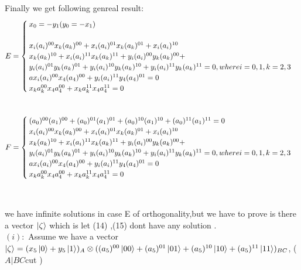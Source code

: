 \documentclass[a4paper,12pt]{article}
\begin{document}
Finally we get following genreal result:
\begin{equation}
E = \begin{cases}
x_{0}=-y_{1}  (y_{0}=-x_{1} )      &  \\

\newline \\
x_{i}(a_{i})^{00}x_{k}(a_{k})^{00}+x_{i}(a_{i})^{01}x_{k}(a_{k})^{01}+x_{i}(a_{i})^{10}\\x_{k}(a_{k})^{10}+x_{i}(a_{i})^{11}x_{k}(a_{k})^{11}+y_{i}(a_{i})^{00}y_{k}(a_{k})^{00}+\\y_{i}(a_{i})^{01}y_{k}(a_{k})^{01}+y_{i}(a_{i})^{10}y_{k}(a_{k})^{10}+y_{i}(a_{i})^{11}y_{k}(a_{k})^{11}=0  
, where i=0,1,k=2,3
\newline\\
a x_{i}(a_{i})^{00}x_{4}(a_{4})^{00}+y_{i}(a_{i})^{11}y_{4}(a_{4})^{01}=0
\newline\\
x_{k}a_{k}^{00}x_{4}a_{4}^{00}+x_{k}a_{k}^{11}x_{4}a_{4}^{11}=0
\end{cases}
\end{equation}
\newline \\
\begin{equation}
F = \begin{cases}
(a_{0})^{00}(a_{1})^{00}+(a_{0})^{01}(a_{1})^{01}+(a_{0})^{10}(a_{1})^{10}+(a_{0})^{11}(a_{1})^{11}=0
\newline \\
x_{i}(a_{i})^{00}x_{k}(a_{k})^{00}+x_{i}(a_{i})^{01}x_{k}(a_{k})^{01}+x_{i}(a_{i})^{10}\\x_{k}(a_{k})^{10}+x_{i}(a_{i})^{11}x_{k}(a_{k})^{11}+y_{i}(a_{i})^{00}y_{k}(a_{k})^{00}+\\y_{i}(a_{i})^{01}y_{k}(a_{k})^{01}+y_{i}(a_{i})^{10}y_{k}(a_{k})^{10}+y_{i}(a_{i})^{11}y_{k}(a_{k})^{11}=0  
, where i=0,1,k=2,3
\newline\\
a x_{i}(a_{i})^{00}x_{4}(a_{4})^{00}+y_{i}(a_{i})^{11}y_{4}(a_{4})^{01}=0
\newline\\
x_{k}a_{k}^{00}x_{4}a_{4}^{00}+x_{k}a_{k}^{11}x_{4}a_{4}^{11}=0
\end{cases}
\end{equation}
\newline \\
\leavevmode
\newline \\
we have infinite solutions in case E of orthogonality,but we have to prove  is  there a vector  $\ket{\zeta}$ which is  let (14) ,(15) dont have  any solution .
\newline \\
$(i)    :$ Assume we have a vector $\ket{\zeta}=(x_{5}\ket{0}+y_{5}\ket{1})_{A}\otimes ((a_{5})^{00}\ket{00}+(a_{5})^{01}\ket{01}+(a_{5})^{10}\ket{10}+(a_{5})^{11}\ket{11})_{BC}$,   ( $      A|BC    $cut   )
\end{document}
